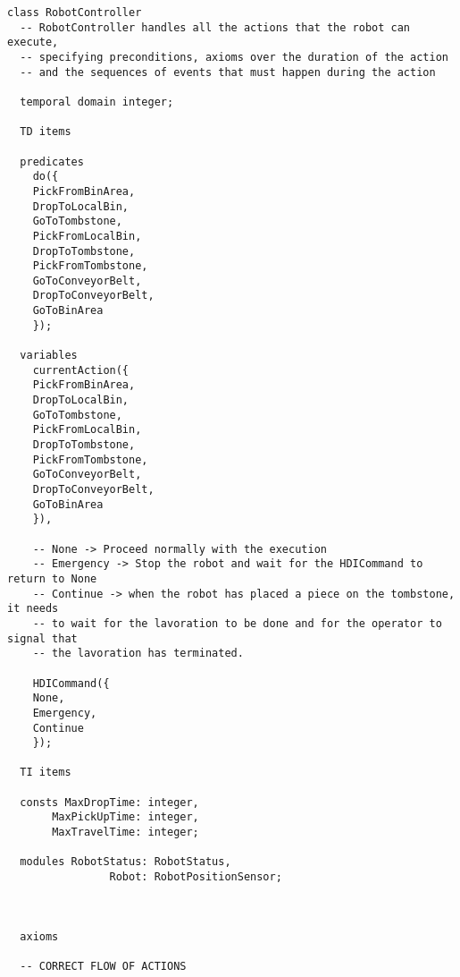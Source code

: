 \begin{lstlisting}[fontadjust, mathescape, frame=single]
class RobotController
  -- RobotController handles all the actions that the robot can execute, 
  -- specifying preconditions, axioms over the duration of the action
  -- and the sequences of events that must happen during the action

  temporal domain integer;

  TD items

  predicates
    do({
    PickFromBinArea,
    DropToLocalBin,
    GoToTombstone,
    PickFromLocalBin,
    DropToTombstone,
    PickFromTombstone,
    GoToConveyorBelt,
    DropToConveyorBelt,
    GoToBinArea
    });

  variables
    currentAction({
    PickFromBinArea,
    DropToLocalBin,
    GoToTombstone,
    PickFromLocalBin,
    DropToTombstone,
    PickFromTombstone,
    GoToConveyorBelt,
    DropToConveyorBelt,
    GoToBinArea
    }),

    -- None -> Proceed normally with the execution
    -- Emergency -> Stop the robot and wait for the HDICommand to return to None
    -- Continue -> when the robot has placed a piece on the tombstone, it needs 
    -- to wait for the lavoration to be done and for the operator to signal that 
    -- the lavoration has terminated.

    HDICommand({
    None,
    Emergency,
    Continue
    });
    
  TI items 
  
  consts MaxDropTime: integer,
       MaxPickUpTime: integer,
       MaxTravelTime: integer;

  modules RobotStatus: RobotStatus,
                Robot: RobotPositionSensor;

  
  
  axioms

  -- CORRECT FLOW OF ACTIONS


\end{lstlisting}
